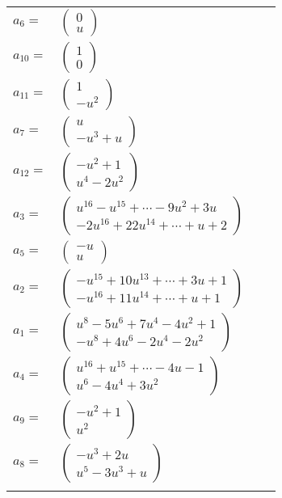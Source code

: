 \documentclass[1p]{elsarticle_modified}
\theoremstyle{definition}
\begin{document}
\begin{tabular}{m{7pt} m{180pt} m{7pt} m{180pt} }
\flushright $a_{6}=$&$\begin{pmatrix}0\\u\end{pmatrix}$ \\
\flushright $a_{10}=$&$\begin{pmatrix}1\\0\end{pmatrix}$ \\
\flushright $a_{11}=$&$\begin{pmatrix}1\\- u^2\end{pmatrix}$ \\
\flushright $a_{7}=$&$\begin{pmatrix}u\\- u^3+u\end{pmatrix}$ \\
\flushright $a_{12}=$&$\begin{pmatrix}- u^2+1\\u^4-2 u^2\end{pmatrix}$ \\
\flushright $a_{3}=$&$\begin{pmatrix}u^{16}- u^{15}+\cdots-9 u^2+3 u\\-2 u^{16}+22 u^{14}+\cdots+u+2\end{pmatrix}$ \\
\flushright $a_{5}=$&$\begin{pmatrix}- u\\u\end{pmatrix}$ \\
\flushright $a_{2}=$&$\begin{pmatrix}- u^{15}+10 u^{13}+\cdots+3 u+1\\- u^{16}+11 u^{14}+\cdots+u+1\end{pmatrix}$ \\
\flushright $a_{1}=$&$\begin{pmatrix}u^8-5 u^6+7 u^4-4 u^2+1\\- u^8+4 u^6-2 u^4-2 u^2\end{pmatrix}$ \\
\flushright $a_{4}=$&$\begin{pmatrix}u^{16}+u^{15}+\cdots-4 u-1\\u^6-4 u^4+3 u^2\end{pmatrix}$ \\
\flushright $a_{9}=$&$\begin{pmatrix}- u^2+1\\u^2\end{pmatrix}$ \\
\flushright $a_{8}=$&$\begin{pmatrix}- u^3+2 u\\u^5-3 u^3+u\end{pmatrix}$\\&\end{tabular}
\end{document}
